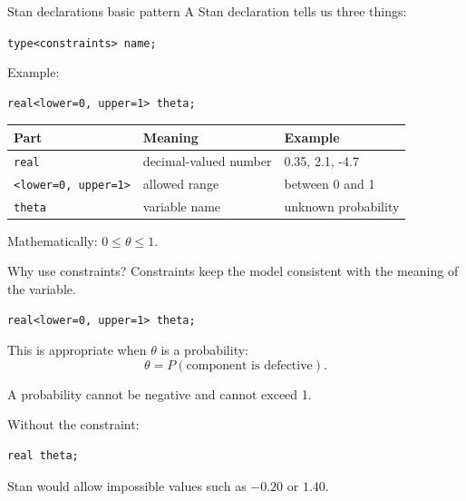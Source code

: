 \documentclass[aspectratio=43,11pt]{beamer}
\begin{document}
\begin{frame}[fragile]{Stan declarations basic pattern}
A Stan declaration tells us three things:

\vspace{0.2cm}
\begin{center}
\texttt{type<constraints> name;}
\end{center}

Example:
\begin{lstlisting}[style=stancode]
real<lower=0, upper=1> theta;
\end{lstlisting}

\begin{center}
\scriptsize
\begin{tabular}{lll}
\toprule
\textbf{Part} & \textbf{Meaning} & \textbf{Example} \\
\midrule
\texttt{real} & decimal-valued number & 0.35, 2.1, -4.7 \\
\texttt{<lower=0, upper=1>} & allowed range & between 0 and 1 \\
\texttt{theta} & variable name & unknown probability \\
\bottomrule
\end{tabular}
\end{center}

Mathematically: \quad $0\leq\theta\leq1$.
\end{frame}

\begin{frame}[fragile]{Why use constraints?}
Constraints keep the model consistent with the meaning of the variable.

\begin{lstlisting}[style=stancode]
real<lower=0, upper=1> theta;
\end{lstlisting}

This is appropriate when $\theta$ is a probability:
\[
\theta=P(\text{component is defective}).
\]

A probability cannot be negative and cannot exceed 1.

\vspace{0.3cm}
Without the constraint:
\begin{lstlisting}[style=stancode]
real theta;
\end{lstlisting}
Stan would allow impossible values such as $-0.20$ or $1.40$.
\end{frame}
\end{document}
